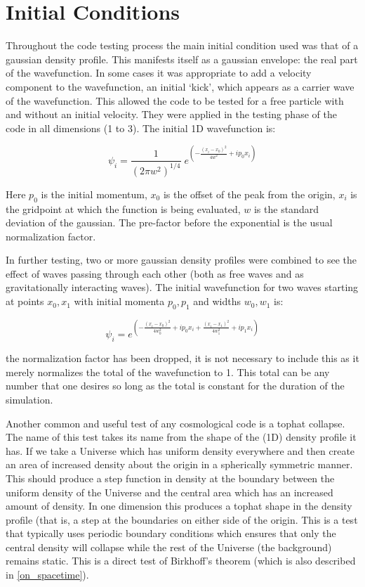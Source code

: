 \section{Initial Conditions}
Throughout the code testing process the main initial condition used was that of a gaussian density profile. This manifests itself as a gaussian envelope: the real part of the wavefunction.  In some cases it was appropriate to add a velocity component to the wavefunction, an initial `kick', which appears as a carrier wave of the wavefunction. This allowed the code to be tested for a free particle with and without an initial velocity. They were applied in the testing phase of the code in all dimensions (1 to 3). The initial 1D wavefunction is:

\begin{equation}
\psi_i = \frac{1}{(2\pi w^2)^{1/4}} \;  e^ {\left( -\frac{(x_i-x_0)^2}{4 w^2} + i p_0 x_i \right)}
\end{equation}

\noindent Here $p_0$ is the initial momentum, $x_0$ is the offset of the peak from the origin, $x_i$ is the gridpoint at which the function is being evaluated, $w$ is the standard deviation of the gaussian. The pre-factor before the exponential is the usual normalization factor.

In further testing, two or more gaussian density profiles were combined to see the effect of waves passing through each other (both as free waves and as gravitationally interacting waves). The initial wavefunction for two waves starting at points $x_0, x_1$ with initial momenta $p_0, p_1$ and widths $w_0, w_1$ is:

\begin{equation}
\psi_i =  e^{\left( -\frac{(x_i-x_0)^2}{4 w_0^2} + i p_0 x_i + \frac{(x_i-x_1)^2}{4 w_1^2} + i p_1 x_i \right) }
\end{equation}

\noindent the normalization factor has been dropped, it is not necessary to include this as it merely normalizes the total of the wavefunction to 1. This total can be any number that one desires so long as the total is constant for the duration of the simulation.

Another common and useful test of any cosmological code is a tophat collapse. The name of this test takes its name from the shape of the (1D) density profile it has. If we take a Universe which has uniform density everywhere and then create an area of increased density about the origin in a spherically symmetric manner. This should produce a step function in density at the boundary between the uniform density of the Universe and the central area which has an increased amount of density. In one dimension this produces a tophat shape in the density profile (that is, a step at the boundaries on either side of the origin. This is a test that typically uses periodic boundary conditions which ensures that only the central density will collapse while the rest of the Universe (the background) remains static. This is a direct test of Birkhoff's theorem (which is also described in \ref{on_spacetime}).


